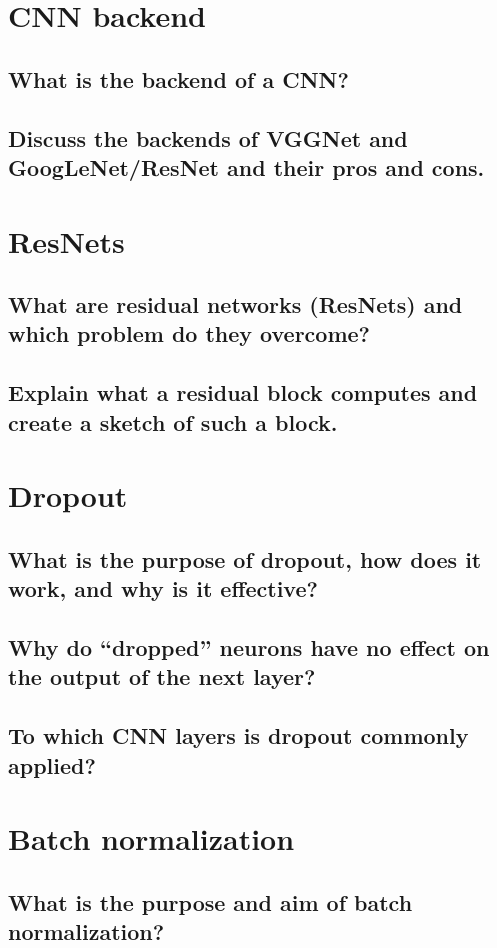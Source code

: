 \section{CNN backend}
\subsection{What is the backend of a CNN?}
\subsection{Discuss the backends of VGGNet and GoogLeNet/ResNet and their pros and cons.}

\section{ResNets}
\subsection{What are residual networks (ResNets) and which problem do they overcome?}
\subsection{Explain what a residual block computes and create a sketch of such a block.}

\section{Dropout}
\subsection{What is the purpose of dropout, how does it work, and why is it effective?}
\subsection{Why do ``dropped'' neurons have no effect on the output of the next layer?}
\subsection{To which CNN layers is dropout commonly applied?}

\section{Batch normalization}
\subsection{What is the purpose and aim of batch normalization?}
